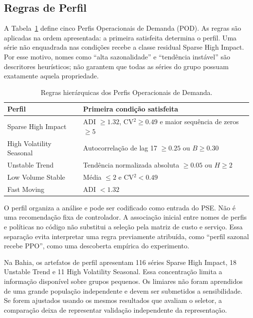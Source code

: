 \subsection{Regras de Perfil}

A Tabela~\ref{tab:pod} define cinco Perfis Operacionais de Demanda (POD). As regras são aplicadas na ordem apresentada: a primeira satisfeita determina o perfil. Uma série não enquadrada nas condições recebe a classe residual Sparse High Impact. Por esse motivo, nomes como ``alta sazonalidade'' e ``tendência instável'' são descritores heurísticos; não garantem que todas as séries do grupo possuam exatamente aquela propriedade.

\begin{table}[htbp]
\centering\small
\caption{Regras hierárquicas dos Perfis Operacionais de Demanda.}\label{tab:pod}
\begin{tabular}{lp{8cm}}
\toprule
Perfil & Primeira condição satisfeita\\
\midrule
Sparse High Impact & ADI $\geq1.32$, CV$^2\geq0.49$ e maior sequência de zeros $\geq5$\\
High Volatility Seasonal & Autocorrelação de lag 17 $\geq0.25$ ou $B\geq0.30$\\
Unstable Trend & Tendência normalizada absoluta $\geq0.05$ ou $H\geq2$\\
Low Volume Stable & Média $\leq2$ e CV$^2<0.49$\\
Fast Moving & ADI $<1.32$\\
\bottomrule
\end{tabular}
\end{table}

O perfil organiza a análise e pode ser codificado como entrada do PSE. Não é uma recomendação fixa de controlador. A associação inicial entre nomes de perfis e políticas no código não substitui a seleção pela matriz de custo e serviço. Essa separação evita interpretar uma regra previamente atribuída, como ``perfil sazonal recebe PPO'', como uma descoberta empírica do experimento.

Na Bahia, os artefatos de perfil apresentam 116 séries Sparse High Impact, 18 Unstable Trend e 11 High Volatility Seasonal. Essa concentração limita a informação disponível sobre grupos pequenos. Os limiares não foram aprendidos de uma grande população independente e devem ser submetidos a sensibilidade. Se forem ajustados usando os mesmos resultados que avaliam o seletor, a comparação deixa de representar validação independente da representação.

